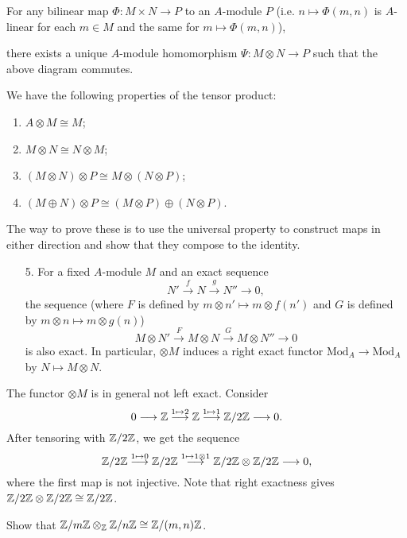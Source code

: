 \begin{prop}
  For any bilinear map
  $\Phi : M \times N \to P$ to
  an $A$-module $P$ (i.e.
  $n \mapsto \Phi(m, n)$ is $A$-linear
  for each $m \in M$ and the same
  for $m \mapsto \Phi(m, n)$),
  \begin{center}
  \end{center}
  there exists a unique $A$-module
  homomorphism $\Psi : M \otimes N \to P$
  such that the above diagram commutes.
\end{prop}

\begin{remark}
  We have the following properties
  of the tensor product:
  \begin{enumerate}
    \item $A \otimes M \cong M$;
    \item $M \otimes N \cong N \otimes M$;
    \item $(M \otimes N) \otimes P \cong M \otimes (N \otimes P)$;
    \item $(M \oplus N) \otimes P \cong (M \otimes P) \oplus (N \otimes P)$.
  \end{enumerate}
  The way to prove these is to use
  the universal property to construct
  maps in either direction and show that
  they compose to the identity.
  \begin{enumerate}
    \item[5.] For a fixed $A$-module
      $M$ and an exact sequence
      \[
        N' \overset{f}{\longrightarrow} N \overset{g}{\longrightarrow} N'' \longrightarrow 0,
      \]
      the sequence (where
      $F$ is defined by $m \otimes n' \mapsto m \otimes f(n')$ and
      $G$ is defined by $m \otimes n \mapsto m \otimes g(n)$)
      \[
        M \otimes N' \overset{F}{\longrightarrow} M \otimes N \overset{G}{\longrightarrow} M \otimes N'' \longrightarrow 0
      \]
      is also exact. In particular,
      $\otimes M$ induces a
      right exact functor
      $\mathrm{Mod}_A \to \mathrm{Mod}_A$
      by $N \mapsto M \otimes N$.
  \end{enumerate}
\end{remark}

\begin{example}
  The functor $\otimes M$ is in general
  not left exact. Consider
  \[
    0 \longrightarrow \mathbb{Z} \overset{1 \mapsto 2}{\longrightarrow} \mathbb{Z} \overset{1 \mapsto 1}{\longrightarrow} \mathbb{Z} / 2\mathbb{Z} \longrightarrow 0.
  \]
  After tensoring with $\mathbb{Z} / 2\mathbb{Z}$, we get
  the sequence
  \[
    \mathbb{Z} / 2\mathbb{Z} \overset{1 \mapsto 0}{\longrightarrow} \mathbb{Z} / 2\mathbb{Z} \overset{1 \mapsto 1 \otimes 1}{\longrightarrow} \mathbb{Z} / 2\mathbb{Z} \otimes \mathbb{Z} / 2\mathbb{Z} \longrightarrow 0,
  \]
  where the first map is not injective.
  Note that right exactness gives
  $\mathbb{Z} / 2\mathbb{Z} \otimes \mathbb{Z} / 2\mathbb{Z} \cong \mathbb{Z} / 2\mathbb{Z}$.
\end{example}

\begin{exercise}
  Show that $\mathbb{Z} / m\mathbb{Z} \otimes_{\mathbb{Z}} \mathbb{Z} / n\mathbb{Z} \cong \mathbb{Z} / (m, n)\mathbb{Z}$.
\end{exercise}
